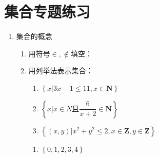 \chapter*{集合专题练习}
\begin{enumerate}
    \item 集合的概念
    \begin{enumerate}
        \item 用符号$\in , \notin$填空： \\
        \item 用列举法表示集合：
        \begin{enumerate}
            \item $\left\{x|3x-1 \leq 11, x \in \mathbf{N}\right\}$
            \item $\left\{x|x \in N \mbox{且} \dfrac{6}{x+2} \in \mathbf{N}\right\}$
            \item $\left\{(x, y) | x^2 + y^2 \leq 2, x \in \mathbf{Z}, y \in \mathbf{Z}\right\}$
        \end{enumerate}
        \begin{jieda}
            \begin{enumerate}
                \item $\left\{0,1,2,3,4\right\}$

\end{enumerate}
\end{jieda}
\end{enumerate}
\end{enumerate}
